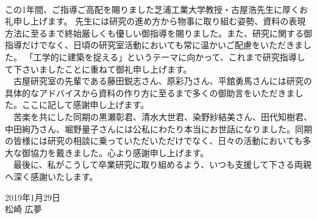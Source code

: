 \begin{acknowledgment}
\thispagestyle{fancy}
\\この1年間、ご指導ご高配を賜りました芝浦工業大学教授・古屋浩先生に厚くお礼申し上げます。
先生には研究の進め方から物事に取り組む姿勢、資料の表現方法に至るまで終始厳しくも優しい御指導を賜りました。また、研究に関する御指導だけでなく、日頃の研究室活動においても常に温かいご配慮をいただきました。
「工学的に建築を捉える」というテーマに向かって、これまで研究指導して下さいましたことに重ねて御礼申し上げます。
\\　古屋研究室の先輩である藤田鋭志さん、原彩乃さん、平舘勇馬さんには研究の具体的なアドバイスから資料の作り方に至るまで多くの御助言をいただきました。ここに記して感謝申し上げます。
\\　苦楽を共にした同期の黒瀬彰君、清水大世君、染野紗結美さん、田代知樹君、中田絢乃さん、堀野量子さんには公私にわたり本当にお世話になりました。同期の皆様には研究の相談に乗っていただいただけでなく、日々の活動においても多大な御協力を戴きました。心より感謝申し上げます。
\\　最後に、私がこうして卒業研究に取り組めるよう、いつも支援して下さる両親へ深く感謝いたします。
\\
\begin{flushright}
2019年1月29日\\
松崎 広夢
\end{flushright}
\end{acknowledgment}
